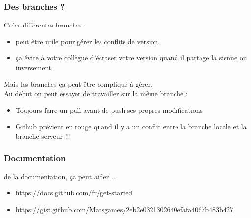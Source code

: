 \begin{frame}
  \frametitle{Des branches ?}
 Créer différentes branches :\\  
  \begin{itemize}
\item {} peut être utile pour gérer les conflits de version.
\item {} ça évite à votre collègue d'écraser votre version quand il partage la sienne ou inversement.
\end{itemize}

 Mais les branches ça peut être compliqué à gérer. \\
\textcolor{green}{} Au début on peut essayer de travailler sur la même branche : \\
\begin{itemize}
\item {} Toujours faire un pull avant de push ses propres modifications
\item \textcolor{orange}{} Github prévient en rouge quand il y a un conflit entre la branche locale et la branche serveur !!!
\end{itemize}


\end{frame}

\begin{frame}
  \frametitle{Documentation}

 de la documentation, ça peut aider ...\\
\begin{itemize}
\item {} \url{https://docs.github.com/fr/get-started}
\item {} \url{https://gist.github.com/Marsgames/2eb2e0321302640efafa4067b483b427}
\end{itemize}


\end{frame}

